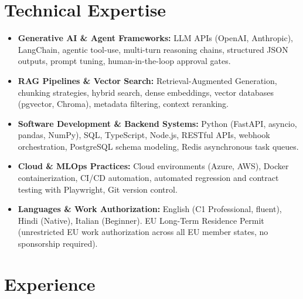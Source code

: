 \documentclass[10pt,a4paper]{article}
\begin{document}
\section{Technical Expertise}
\begin{itemize}
  \item \textbf{Generative AI \& Agent Frameworks:} LLM APIs (OpenAI, Anthropic), LangChain, agentic tool-use, multi-turn reasoning chains, structured JSON outputs, prompt tuning, human-in-the-loop approval gates.
  \item \textbf{RAG Pipelines \& Vector Search:} Retrieval-Augmented Generation, chunking strategies, hybrid search, dense embeddings, vector databases (pgvector, Chroma), metadata filtering, context reranking.
  \item \textbf{Software Development \& Backend Systems:} Python (FastAPI, asyncio, pandas, NumPy), SQL, TypeScript, Node.js, RESTful APIs, webhook orchestration, PostgreSQL schema modeling, Redis asynchronous task queues.
  \item \textbf{Cloud \& MLOps Practices:} Cloud environments (Azure, AWS), Docker containerization, CI/CD automation, automated regression and contract testing with Playwright, Git version control.
  \item \textbf{Languages \& Work Authorization:} English (C1 Professional, fluent), Hindi (Native), Italian (Beginner). EU Long-Term Residence Permit (unrestricted EU work authorization across all EU member states, no sponsorship required).
\end{itemize}

\section{Experience}
\end{document}
